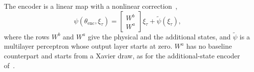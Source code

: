 The encoder is a linear map with a nonlinear
correction~\cite[Eq.~(8)]{hoekstra2026encoder},
\begin{equation}
 \psi(\theta_{\mathrm{enc}},\xi_\tau)
 =\begin{bmatrix}W^b\\ W^a\end{bmatrix}\xi_\tau+\tilde\psi(\xi_\tau),
 \label{eq:aug_enc_lin}
\end{equation}
where the rows $W^b$ and $W^a$ give the physical and the additional states,
and $\tilde\psi$ is a multilayer perceptron whose output layer starts at zero.
$W^a$ has no baseline counterpart and starts from a Xavier draw, as for the
additional-state encoder of~\cite[Eq.~(31)]{hoekstra2026lfr}.

